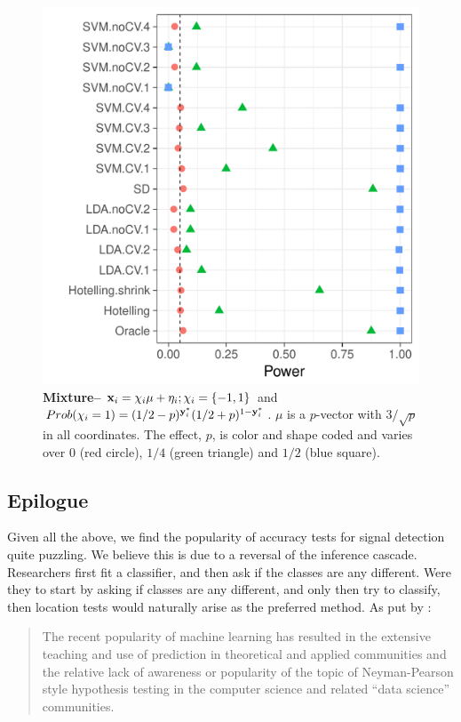 \documentclass[12pt,a4paper]{article}
\begin{document}
\begin{figure}[ht]
\centering
	  \includegraphics[width=0.7\linewidth]{"art/file12"}
	  \caption{\textbf{Mixture--} $\mathbf{x}_i = \chi_i \mu + \eta_i; \chi_i = \{ -1,1 \}$ and $Prob( \chi_i=1 )=(1/2-p)^{\mathbf{y}^*_i}  (1/2+p)^{1-\mathbf{y}^*_i}$. $\mu$ is a $p$-vector with $3/\sqrt{p}$ in all coordinates.
	  The effect, $p$, is color and shape coded and varies over $0$ (red circle), $1/4$ (green triangle) and $1/2$ (blue square). }
	\label{fig:golland}
\end{figure}










\subsection{Epilogue}
Given all the above, we find the popularity of accuracy tests for signal detection quite puzzling. 
We believe this is due to a reversal of the inference cascade. 
Researchers first fit a classifier, and then ask if the classes are any different.
Were they to start by asking if classes are any different, and only then try to classify, then location tests would naturally arise as the preferred method. 
As put by \cite{ramdas_classification_2016}:
\begin{quote}
The recent popularity of machine learning has resulted in the extensive teaching and use
of prediction in theoretical and applied communities and the relative lack of awareness or
popularity of the topic of Neyman-Pearson style hypothesis testing in the computer science
and related ``data science'' communities.
\end{quote}
\end{document}
